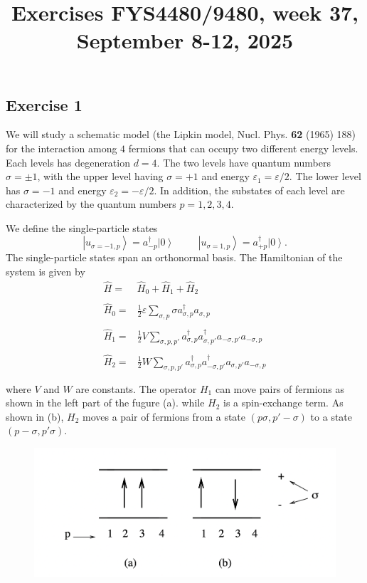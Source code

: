 \documentclass[prc]{revtex4}
\newcommand{\ket}[1]{\left| #1 \right\rangle}
\begin{document}
\title{Exercises FYS4480/9480, week 37, September 8-12, 2025}
\maketitle
\subsection*{Exercise 1}

We will study a schematic model (the Lipkin model, Nucl.
Phys. {\bf 62} (1965) 188) for the interaction among  $4$
fermions that can occupy two different energy levels. Each levels has degeneration $d=4$. The two levels have quantum numbers $\sigma=\pm 1$,
with the upper level having  $\sigma=+1$ and energy
$\varepsilon_{1}=
\varepsilon/2$. The lower level  has $\sigma=-1$ and energy
$\varepsilon_{2}=-\varepsilon/2$. 
In addition, the substates  of each level are characterized  
by the quantum numbers $p=1,2,3,4$.

We define the single-particle states
\[
\ket{u_{\sigma =-1,p}}=a_{-p}^{\dagger}\ket{0}
\hspace{1cm}
\ket{u_{\sigma =1,p}}=a_{+p}^{\dagger}\ket{0}.
\]
The single-particle states span an orthonormal basis.
The Hamiltonian of the system is given by
\[
\begin{array}{ll}
\hat{H}=&\hat{H}_{0}+\hat{H}_{1}+\hat{H}_{2}\\
&\\
\hat{H}_{0}=&\frac{1}{2}\varepsilon\sum_{\sigma ,p}\sigma
a_{\sigma,p}^{\dagger}a_{\sigma ,p}\\
&\\
\hat{H}_{1}=&\frac{1}{2}V\sum_{\sigma ,p,p'}
a_{\sigma,p}^{\dagger}a_{\sigma ,p'}^{\dagger}
a_{-\sigma ,p'}a_{-\sigma ,p}\\
&\\
\hat{H}_{2}=&\frac{1}{2}W\sum_{\sigma ,p,p'}
a_{\sigma,p}^{\dagger}a_{-\sigma ,p'}^{\dagger}
a_{\sigma ,p'}a_{-\sigma ,p}\\
&\\
\end{array}
\]
where $V$ and $W$ are constants. The operator 
$H_{1}$ can move pairs of fermions as shown in the left part of the fugure (a).
while $H_{2}$ is a spin-exchange term.
As shown in (b),
$H_{2}$ moves a pair of fermions from a state $(p\sigma ,p' -\sigma)$ to a state
$(p-\sigma ,p'\sigma)$.
\begin{figure}[hbtp]
\centering
\includegraphics[width=.6\textwidth]{lipkin.png}
\end{figure}
\end{document}
